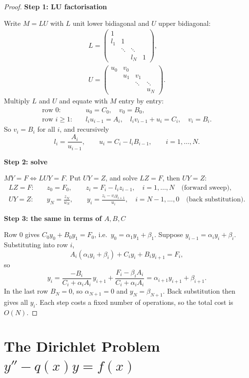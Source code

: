 \documentclass[11pt,a4paper]{article}
\numberwithin{equation}{section}
\theoremstyle{spacedplain}
\theoremstyle{spaceddefinition}
\theoremstyle{spacedremark}
\newcommand{\step}[1]{\par\addvspace{0.6em}\noindent\textbf{#1}\par\nobreak}
\begin{document}
\begin{proof}\leavevmode
\step{Step 1: LU factorisation}
Write \(M=LU\) with \(L\) unit lower
bidiagonal and \(U\) upper bidiagonal:
\[
\begin{gathered}
  L=\begin{pmatrix}1&&&\\ l_1&1&&\\ &\ddots&\ddots&\\ &&l_N&1\end{pmatrix},
  \\
  U=\begin{pmatrix}u_0&v_0&&\\ &u_1&v_1&\\ &&\ddots&\ddots\\ &&&u_N\end{pmatrix}.
\end{gathered}
\]
Multiply \(L\) and \(U\) and equate with \(M\) entry by entry:
\begin{align*}
  \text{row }0:&\quad u_0=C_0,\quad v_0=B_0,\\
  \text{row }i\ge1:&\quad l_iu_{i-1}=A_i,\quad l_iv_{i-1}+u_i=C_i,
    \quad v_i=B_i .
\end{align*}
So \(v_i=B_i\) for all \(i\), and recursively
\[
  l_i=\frac{A_i}{u_{i-1}},\qquad u_i=C_i-l_iB_{i-1},
  \qquad i=1,\dots,N.
\]

\step{Step 2: solve}
\(MY=F\iff LUY=F\).  Put \(UY=Z\), and solve
\(LZ=F\), then \(UY=Z\):
\begin{align*}
  LZ=F:&\quad z_0=F_0,\qquad z_i=F_i-l_iz_{i-1},\quad i=1,\dots,N
    \quad\text{(forward sweep)},\\
  UY=Z:&\quad y_N=\frac{z_N}{u_N},\qquad
    y_i=\frac{z_i-v_iy_{i+1}}{u_i},\quad i=N-1,\dots,0
    \quad\text{(back substitution)}.
\end{align*}

\step{Step 3: the same in terms of \(A,B,C\)}
Row \(0\) gives
\(C_0y_0+B_0y_1=F_0\), i.e.\ \(y_0=\alpha_1y_1+\beta_1\).  Suppose
\(y_{i-1}=\alpha_iy_i+\beta_i\).  Substituting into row \(i\),
\[
  A_i(\alpha_iy_i+\beta_i)+C_iy_i+B_iy_{i+1}=F_i,
\]
so
\[
  y_i=\frac{-B_i}{C_i+\alpha_iA_i}\,y_{i+1}
     +\frac{F_i-\beta_iA_i}{C_i+\alpha_iA_i}
     =\alpha_{i+1}y_{i+1}+\beta_{i+1}.
\]
In the last row \(B_N=0\), so \(\alpha_{N+1}=0\) and
\(y_N=\beta_{N+1}\).  Back substitution then gives all \(y_i\).  Each
step costs a fixed number of operations, so the total cost is
\(O(N)\).
\end{proof}

\section{The Dirichlet Problem \(y''-q(x)y=f(x)\)}
\end{document}
